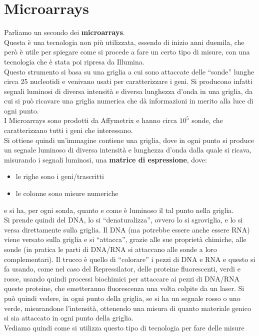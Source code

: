 \documentclass[a4paper,12pt, oneside]{book}
\begin{document}
\section{Microarrays}
Parliamo un secondo dei \textbf{microarrays}.\\
Questa è una tecnologia non più utilizzata, essendo di inizio anni duemila, che
però è utile per spiegare come si procede a fare un certo tipo di misure, con
una tecnologia che è stata poi ripresa da Illumina.\\
Questo strumento si basa su una griglia a cui sono attaccate delle ``sonde''
lunghe circa 25 nucleotidi e venivano usati per caratterizzare i geni. Si
producono infatti segnali luminosi di diversa intensità e diversa lunghezza
d'onda in una griglia, da cui si può ricavare una griglia numerica che dà
informazioni in merito alla luce di ogni punto.\\
I Microarrays sono prodotti da Affymetrix e hanno circa $10^5$ sonde, che
caratterizzano tutti i geni che interessano. \\
Si ottiene quindi un'immagine contiene una griglia, dove in ogni punto si
produce un segnale luminoso di diversa intensità e lunghezza d'onda dalla quale
si ricava, misurando i segnali luminosi, una \textbf{matrice di espressione},
dove:
\begin{itemize}
  \item le righe sono i geni/trascritti
  \item le colonne sono misure numeriche
\end{itemize}
e si ha, per ogni sonda, quanto e come è luminoso il tal punto nella griglia.\\
Si prende quindi del DNA, lo si ``denaturalizza'', ovvero lo si sgroviglia, e lo
si versa direttamente sulla griglia. Il DNA (ma potrebbe essere anche essere
RNA) viene versato sulla griglia e si ``attacca'', grazie alle sue proprietà
chimiche, alle sonde (in pratica le parti di DNA/RNA si attaccano alle sonde a
loro complementari). Il trucco è quello di ``colorare'' i pezzi di DNA e RNA e
questo si fa usando, come nel caso del Repressilator, delle proteine
fluorescenti, verdi e rosse, usando quindi processi biochimici per attaccare ai
pezzi di DNA/RNA queste proteine, che emetteranno fluorescenza una volta colpite
da un laser. Si può quindi vedere, in ogni punto della griglia, se si ha un
segnale rosso o uno verde, misurandone l'intensità, ottenendo una misura di
quanto materiale genico si sia attaccato in ogni punto della griglia.\\
Vediamo quindi come si utilizza questo tipo di tecnologia per fare delle misure
\end{document}

